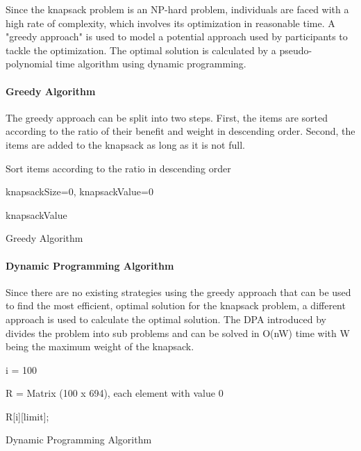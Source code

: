 Since the knapsack problem is an NP-hard problem, individuals are faced with a high rate of complexity, which involves its optimization in reasonable time. A "greedy approach" is used to model a potential approach used by participants to tackle the optimization.
The optimal solution is calculated by a pseudo-polynomial time algorithm using dynamic programming.


\paragraph{Greedy Algorithm}
The greedy approach can be split into two steps. First, the items are sorted according to the ratio of their benefit and weight in descending order. Second, the items are added to the knapsack as long as it is not full.\\

\begin{algorithm} %
\LinesNumbered
\setcounter{AlgoLine}{0}
\SetNoFillComment
 \SetAlgoLined
Sort items according to the ratio in descending order\;

knapsackSize=0, knapsackValue=0\;

\Return knapsackValue\;

\caption{Greedy Algorithm}
\end{algorithm}

\paragraph{Dynamic Programming Algorithm}
\label{par:DynamicProgrammingAlgorithm}
Since there are no existing strategies using the greedy approach that can be used to find the most efficient, optimal solution for the knapsack problem, a different approach is used to calculate the optimal solution. The \ac{DPA} introduced by \cite{Kleinberg2005}  divides the problem into sub problems and can be solved in O(nW) time with W being the maximum weight of the knapsack.\\

\begin{algorithm} %
\LinesNumbered
\setcounter{AlgoLine}{0}
\SetNoFillComment
 \SetAlgoLined
 
i = 100\;

R = Matrix (100 x 694), each element with value 0\;

\Return R[i][limit]; 
\caption{Dynamic Programming Algorithm}
\end{algorithm}


